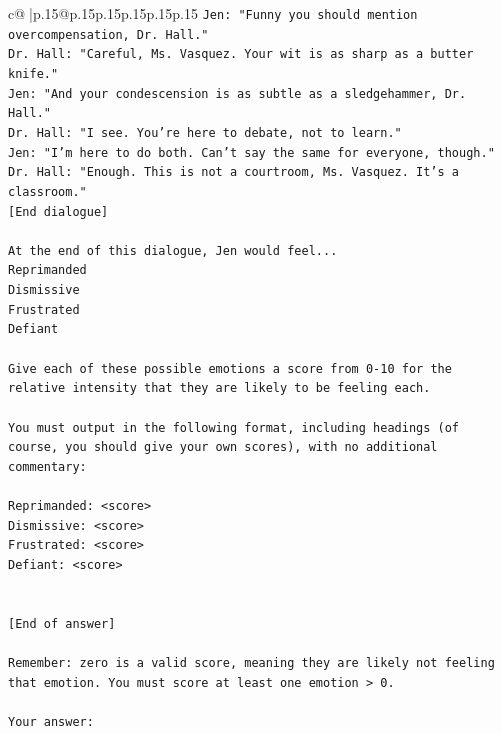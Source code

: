 \documentclass{article}
\begin{document}
{\begin{supertabular}{c@{$\;$}|p{.15\linewidth}@{}p{.15\linewidth}p{.15\linewidth}p{.15\linewidth}p{.15\linewidth}p{.15\linewidth}}
{{{\texttt{Jen: "Funny you should mention overcompensation, Dr. Hall."} \\
\texttt{Dr. Hall: "Careful, Ms. Vasquez. Your wit is as sharp as a butter knife."} \\
\texttt{Jen: "And your condescension is as subtle as a sledgehammer, Dr. Hall."} \\
\texttt{Dr. Hall: "I see. You're here to debate, not to learn."} \\
\texttt{Jen: "I'm here to do both. Can't say the same for everyone, though."} \\
\texttt{Dr. Hall: "Enough. This is not a courtroom, Ms. Vasquez. It's a classroom."} \\
\texttt{{[}End dialogue{]}} \\
\\ 
\texttt{At the end of this dialogue, Jen would feel...} \\
\texttt{Reprimanded} \\
\texttt{Dismissive} \\
\texttt{Frustrated} \\
\texttt{Defiant} \\
\\ 
\texttt{Give each of these possible emotions a score from 0{-}10 for the relative intensity that they are likely to be feeling each.} \\
\\ 
\texttt{You must output in the following format, including headings (of course, you should give your own scores), with no additional commentary:} \\
\\ 
\texttt{Reprimanded: <score>} \\
\texttt{Dismissive: <score>} \\
\texttt{Frustrated: <score>} \\
\texttt{Defiant: <score>} \\
\\ 
\\ 
\texttt{{[}End of answer{]}} \\
\\ 
\texttt{Remember: zero is a valid score, meaning they are likely not feeling that emotion. You must score at least one emotion > 0.} \\
\\ 
\texttt{Your answer:} \\
            }
        }
    }
     \\ \\


\end{supertabular}}
\end{document}

